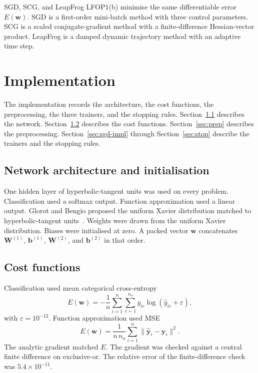 \documentclass[conference,10pt]{IEEEtran}
\begin{document}
SGD, SCG, and LeapFrog LFOP1(b) minimise the same differentiable error $E(\mathbf{w})$.
SGD is a first-order mini-batch method with three control parameters.
SCG is a scaled conjugate-gradient method with a finite-difference Hessian-vector product.
LeapFrog is a damped dynamic trajectory method with an adaptive time step.

\section{Implementation}
\label{sec:implementation}
The implementation records the architecture, the cost functions, the preprocessing, the three trainers, and the stopping rules.
Section~\ref{sec:arch} describes the network.
Section~\ref{sec:cost} describes the cost functions.
Section~\ref{sec:prep} describes the preprocessing.
Section~\ref{sec:sgd-impl} through Section~\ref{sec:stop} describe the trainers and the stopping rules.

\subsection{Network architecture and initialisation}
\label{sec:arch}
One hidden layer of hyperbolic-tangent units was used on every problem.
Classification used a softmax output.
Function approximation used a linear output.
Glorot and Bengio proposed the uniform Xavier distribution matched to hyperbolic-tangent units~\cite{glorot2010}.
Weights were drawn from the uniform Xavier distribution.
Biases were initialised at zero.
A packed vector $\mathbf{w}$ concatenates $\mathbf{W}^{(1)}$, $\mathbf{b}^{(1)}$, $\mathbf{W}^{(2)}$, and $\mathbf{b}^{(2)}$ in that order.

\subsection{Cost functions}
\label{sec:cost}
Classification used mean categorical cross-entropy
\begin{equation}
E(\mathbf{w})=-\frac{1}{n}\sum_{i=1}^{n}\sum_{c=1}^{n_{o}} y_{ic}\log(\hat{y}_{ic}+\varepsilon),
\end{equation}
with $\varepsilon=10^{-12}$.
Function approximation used MSE
\begin{equation}
E(\mathbf{w})=\frac{1}{n\,n_{o}}\sum_{i=1}^{n}\lVert\hat{\mathbf{y}}_{i}-\mathbf{y}_{i}\rVert^{2}.
\end{equation}
The analytic gradient matched $E$.
The gradient was checked against a central finite difference on exclusive-or.
The relative error of the finite-difference check was $5.4\times 10^{-11}$.
\end{document}
